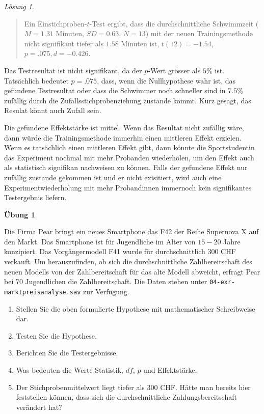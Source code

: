 \documentclass[
]{book}
\providecommand{\tightlist}{%
  \setlength{\itemsep}{0pt}\setlength{\parskip}{0pt}}
\theoremstyle{definition}
\theoremstyle{definition}
\theoremstyle{definition}
\newtheorem{exercise}{Übung}[chapter]
\theoremstyle{definition}
\theoremstyle{remark}
\newtheorem*{solution}{Lösung}
\begin{document}
\begin{solution}
\begin{quote}
Ein Einstichproben-\(t\)-Test ergibt, dass die durchschnittliche Schwimmzeit (\(M = 1.31\) Minuten, \(SD = 0.63\), \(N = 13\)) mit der neuen Trainingsmethode nicht signifikant tiefer als \(1.58\) Minuten ist, \(t(12) = -1.54\), \(p = .075, d = -0.426\).
\end{quote}

Das Testresultat ist nicht signifikant, da der \(p\)-Wert grösser als \(5\%\) ist. Tatsächlich bedeutet \(p = .075\), dass, wenn die Nullhypothese wahr ist, das gefundene Testresultat oder dass die Schwimmer noch schneller sind in \(7.5\%\) zufällig durch die Zufallsstichprobenziehung zustande kommt. Kurz gesagt, das Resulat könnt auch Zufall sein.

Die gefundene Effektstärke ist mittel. Wenn das Resultat nicht zufällig wäre, dann würde die Trainingsmethode immerhin einen mittleren Effekt erzielen. Wenn es tatsächlich einen mittleren Effekt gibt, dann könnte die Sportstudentin das Experiment nochmal mit mehr Probanden wiederholen, um den Effekt auch als statistisch signifikan nachweisen zu können. Falls der gefundene Effekt nur zufällig zustande gekommen ist und er nicht exisitiert, wird auch eine Experimentwiederholung mit mehr Probandinnen immernoch kein signifikantes Testergebnis liefern.
\end{solution}

\begin{exercise}
\protect\hypertarget{exr:markpreisanalyse-testen}{}\label{exr:markpreisanalyse-testen}\leavevmode

Die Firma Pear bringt ein neues Smartphone das F42 der Reihe Supernova X auf den Markt. Das Smartphone ist für Jugendliche im Alter von \(15-20\) Jahre konzipiert. Das Vorgängermodell F41 wurde für durchschnittlich \(300\) CHF verkauft. Um herauszufinden, ob sich die durchschnittliche Zahlbereitschaft des neuen Modells von der Zahlbereitschaft für das alte Modell abweicht, erfragt Pear bei \(70\) Jugendlichen die Zahlbereitschaft. Die Daten stehen unter \texttt{04-exr-marktpreisanalyse.sav} zur Verfügung.

\begin{enumerate}
\def\labelenumi{\alph{enumi})}
\tightlist
\item
  Stellen Sie die oben formulierte Hypothese mit mathematischer Schreibweise dar.
\item
  Testen Sie die Hypothese.
\item
  Berichten Sie die Testergebnisse.
\item
  Was bedeuten die Werte Statistik, \(df\), \(p\) und Effektstärke.
\item
  Der Stichprobenmittelwert liegt tiefer als \(300\) CHF. Hätte man bereits hier feststellen können, dass sich die durchschnittliche Zahlungsbereitschaft verändert hat?
\end{enumerate}

\end{exercise}
\end{document}
